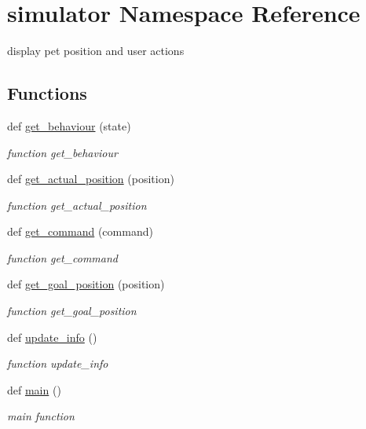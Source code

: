 \hypertarget{namespacesimulator}{}\section{simulator Namespace Reference}
\label{namespacesimulator}


display pet position and user actions  


\subsection*{Functions}
\begin{DoxyCompactItemize}
\item 
def \hyperlink{namespacesimulator_affbc3bee7f4b28215c4fe9e5e9e01003}{get\+\_\+behaviour} (state)
\begin{DoxyCompactList}\small\item\em function get\+\_\+behaviour \end{DoxyCompactList}\item 
def \hyperlink{namespacesimulator_a5265ad4eaba9f8ccb6ff896b006d0f70}{get\+\_\+actual\+\_\+position} (position)
\begin{DoxyCompactList}\small\item\em function get\+\_\+actual\+\_\+position \end{DoxyCompactList}\item 
def \hyperlink{namespacesimulator_a06561cb374c45cd36cb7f77886cc7a7f}{get\+\_\+command} (command)
\begin{DoxyCompactList}\small\item\em function get\+\_\+command \end{DoxyCompactList}\item 
def \hyperlink{namespacesimulator_ad83902aab63958c0d241d17880635167}{get\+\_\+goal\+\_\+position} (position)
\begin{DoxyCompactList}\small\item\em function get\+\_\+goal\+\_\+position \end{DoxyCompactList}\item 
def \hyperlink{namespacesimulator_a66bbb06efc0fb9abaefbfde72c8f0b85}{update\+\_\+info} ()
\begin{DoxyCompactList}\small\item\em function update\+\_\+info \end{DoxyCompactList}\item 
\mbox{\label{namespacesimulator_a711d5bb80a277154e14a12260c2d3b21}} 
def \hyperlink{namespacesimulator_a711d5bb80a277154e14a12260c2d3b21}{main} ()
\begin{DoxyCompactList}\small\item\em main function \end{DoxyCompactList}\end{DoxyCompactItemize}
